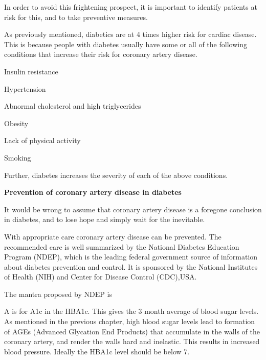 In order to avoid this frightening prospect, it is important to identify patients at risk for this, and to take preventive measures.


As previously mentioned, diabetics are at 4 times higher risk for cardiac disease. This is because people with diabetes usually have some or all of the following conditions that increase their risk for coronary artery disease.

\item Insulin resistance

 \item Hypertension

 \item Abnormal cholesterol and high triglycerides

 \item Obesity

 \item Lack of physical activity

 \item Smoking

Further, diabetes increases the severity of each of the above conditions.

\textbf{Prevention of coronary artery disease in diabetes}

It would be wrong to assume that coronary artery disease is a foregone conclusion in diabetes, and to lose hope and simply wait for the inevitable.

With appropriate care coronary artery disease can be prevented. The recommended care is well summarized by the National Diabetes Education Program (NDEP), which is the leading federal government source of information about diabetes prevention and control. It is sponsored by the National Institutes of Health (NIH) and Center for Disease Control (CDC),USA.

The mantra proposed by NDEP is 

\item A is for A1c in the HBA1c. This gives the 3 month average of blood sugar levels. As mentioned in the previous chapter, high blood sugar levels lead to formation of AGEs (Advanced Glycation End Products) that accumulate in the walls of the coronary artery, and render the walls hard and inelastic. This results in increased blood pressure. Ideally the HBA1c level should be below 7.

